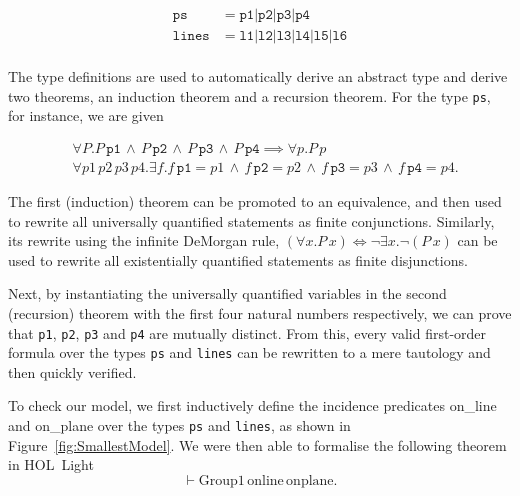 \begin{align*}
\texttt{ps}   &= \texttt{p1} \vert \texttt{p2} \vert\texttt{p3} \vert\texttt{p4}\\
\texttt{lines}&= \texttt{l1} \vert \texttt{l2} \vert\texttt{l3} \vert\texttt{l4} \vert\texttt{l5} \vert\texttt{l6}\\
\end{align*}

The type definitions are used to automatically derive an abstract type and derive two theorems, an induction theorem and a recursion theorem. For the type \texttt{ps}, for instance, we are given

\begin{align*}
&\forall P. P\,\texttt{p1}\,\wedge\,P\,\texttt{p2}\,\wedge\,P\,\texttt{p3}\,\wedge\,P\,\texttt{p4}\implies\forall p. P\,p\\
&\forall p1\,p2\,p3\,p4. \exists f. f\,\texttt{p1} = p1\,\wedge\,f\,\texttt{p2} = p2\,\wedge\,f\,\texttt{p3} = p3\,\wedge\,f\,\texttt{p4} = p4.
\end{align*}

The first (induction) theorem can be promoted to an equivalence, and then used to rewrite all universally quantified statements as finite conjunctions. Similarly, its rewrite using the infinite DeMorgan rule, $(\forall x. P\,x) \iff \neg\exists x. \neg (P\,x)$ can be used to rewrite all existentially quantified statements as finite disjunctions.

Next, by instantiating the universally quantified variables in the second (recursion) theorem with the first four natural numbers respectively, we can prove that \texttt{p1}, \texttt{p2}, \texttt{p3} and \texttt{p4} are mutually distinct. From this, every valid first-order formula over the types \texttt{ps} and \texttt{lines} can be rewritten to a mere tautology and then quickly verified.

To check our model, we first inductively define the incidence predicates on\_line and on\_plane over the types \texttt{ps} and \texttt{lines}, as shown in Figure~\ref{fig:SmallestModel}. We were then able to formalise the following theorem in HOL~Light 
\begin{displaymath}
\vdash \text{Group1}\,\text{online}\,\text{onplane}.
\end{displaymath}

